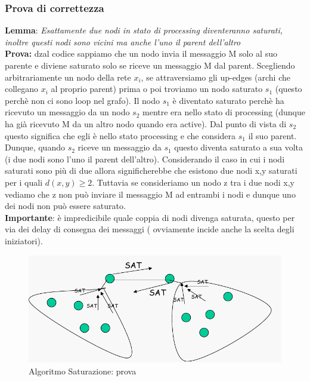 \documentclass[12pt]{article}
\begin{document}
		\subsubsection{Prova di correttezza}
			\textbf{Lemma}: \textit{Esattamente due nodi in stato di processing diventeranno saturati, inoltre questi nodi sono vicini ma anche l'uno il parent dell'altro}\\
			
			\textbf{Prova:} dzal codice sappiamo che un nodo invia il messaggio M solo al suo parente e diviene saturato solo se riceve un messaggio M dal parent. Scegliendo arbitrariamente un nodo della rete $x_{i}$, se attraversiamo gli up-edges (archi che collegano $x_{i}$ al proprio parent) prima o poi troviamo un nodo saturato $s_1$ (questo perchè non ci sono loop nel grafo). Il nodo $s_1$ è diventato saturato perchè ha ricevuto un messaggio da un nodo $s_2$ mentre era nello stato di processing (dunque ha già ricevuto M da un altro nodo quando era active). Dal punto di vista di $s_2$ questo significa che egli è nello stato processing e che considera $s_1$ il suo parent. Dunque, quando $s_2$ riceve un messaggio da $s_1$ questo diventa saturato a sua volta (i due nodi sono l'uno il parent dell'altro). Considerando il caso in cui i nodi saturati sono più di due allora significherebbe che esistono due nodi x,y  saturati per i quali $d(x,y)\geq 2$. Tuttavia se consideriamo un nodo z tra i due nodi x,y vediamo che z non può inviare il messaggio M ad entrambi i nodi e dunque uno dei nodi non può essere saturato. \\
			
			\textbf{Importante}: è impredicibile quale coppia di nodi divenga saturata, questo per via dei delay di consegna dei messaggi ( ovviamente incide anche la scelta degli iniziatori).
			\begin{figure}[h!]
				\centering
				\includegraphics[scale=0.3]{img/satprov.png}
				\caption{Algoritmo Saturazione: prova}
			\end{figure}
		
\end{document}

